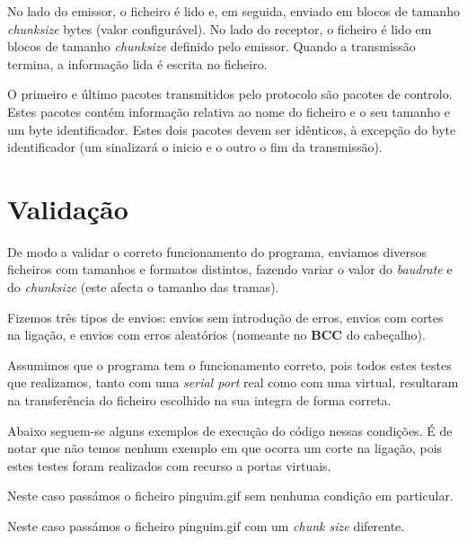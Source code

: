 \documentclass[11pt]{report}
\begin{document}
No lado do emissor, o ficheiro é lido e, em seguida, enviado em blocos de
tamanho \textit{chunksize} bytes (valor configurável). No lado do receptor, o
ficheiro é lido em blocos de tamanho \textit{chunksize} definido pelo emissor.
Quando a transmissão termina, a informação lida é escrita no ficheiro.

O primeiro e último pacotes transmitidos pelo protocolo são pacotes de controlo.
Estes pacotes contém informação relativa ao nome do ficheiro e o seu tamanho e
um byte identificador. Estes dois pacotes devem ser idênticos, à excepção do byte
identificador (um sinalizará o inicio e o outro o fim da transmissão).

{\let\clearpage\relax \chapter{Validação}}

De modo a validar o correto funcionamento do programa, enviamos diversos ficheiros
com tamanhos e formatos distintos, fazendo variar o valor do \textit{baudrate}
e do \textit{chunksize} (este afecta o tamanho das tramas).

Fizemos três tipos de envios: envios sem introdução de erros, envios com cortes
na ligação, e envios com erros aleatórios (nomeante no \textbf{BCC} do cabeçalho).

Assumimos que o programa tem o funcionamento correto, pois todos estes testes
que realizamos, tanto com uma \textit{serial port} real como com uma virtual,
resultaram na transferência do ficheiro escolhido na sua integra de forma correta.

Abaixo seguem-se alguns exemplos de execução do código nessas condições. É de notar
que não temos nenhum exemplo em que ocorra um corte na ligação, pois estes testes
foram realizados com recurso a portas virtuais.

Neste caso passámos o ficheiro pinguim.gif sem nenhuma condição em particular.

Neste caso passámos o ficheiro pinguim.gif com um \textit{chunk size} diferente.
\end{document}
